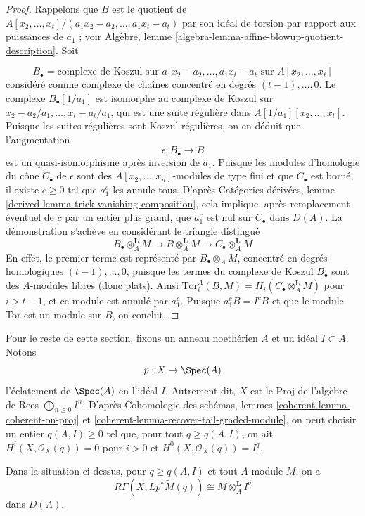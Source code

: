 \begin{proof}
Rappelons que $B$ est le quotient de $A[x_2, \ldots, x_t]/(a_1x_2 - a_2, \ldots, a_1x_t - a_t)$ par son idéal de torsion par rapport aux puissances de $a_1$ ; voir Algèbre, lemme \ref{algebra-lemma-affine-blowup-quotient-description}. Soit

$$
B_\bullet = \text{complexe de Koszul sur }a_1x_2 - a_2, \ldots, a_1x_t - a_t
\text{ sur }A[x_2, \ldots, x_t]
$$
considéré comme complexe de chaînes concentré en degrés $(t - 1), \ldots, 0$. Le complexe $B_\bullet[1/a_1]$ est isomorphe au complexe de Koszul sur $x_2 - a_2/a_1, \ldots, x_t - a_t/a_1$, qui est une suite régulière dans $A[1/a_1][x_2, \ldots, x_t]$. Puisque les suites régulières sont Koszul-régulières, on en déduit que l'augmentation
$$
\epsilon : B_\bullet \longrightarrow B
$$
est un quasi-isomorphisme après inversion de $a_1$. Puisque les modules d'homologie du cône $C_\bullet$ de $\epsilon$ sont des $A[x_2, \ldots, x_n]$-modules de type fini et que $C_\bullet$ est borné, il existe $c \geq 0$ tel que $a_1^c$ les annule tous. D'après Catégories dérivées, lemme \ref{derived-lemma-trick-vanishing-composition}, cela implique, après remplacement éventuel de $c$ par un entier plus grand, que $a_1^c$ est nul sur $C_\bullet$ dans $D(A)$. La démonstration s'achève en considérant le triangle distingué
$$
B_\bullet \otimes_A^\mathbf{L} M \to
B \otimes_A^\mathbf{L} M \to
C_\bullet \otimes_A^\mathbf{L} M
$$
En effet, le premier terme est représenté par $B_\bullet \otimes_A M$, concentré en degrés homologiques $(t - 1), \ldots, 0$, puisque les termes du complexe de Koszul $B_\bullet$ sont des $A$-modules libres (donc plats). Ainsi $\text{Tor}_i^A(B, M) = H_i(C_\bullet \otimes_A^\mathbf{L} M)$ pour $i > t - 1$, et ce module est annulé par $a_1^c$. Puisque $a_1^cB = I^cB$ et que le module Tor est un module sur $B$, on conclut.
\end{proof}

\noindent
Pour le reste de cette section, fixons un anneau noethérien $A$ et un idéal $I \subset A$. Notons
$$
p : X \to \Spec(A)
$$
l'éclatement de $\Spec(A)$ en l'idéal $I$. Autrement dit, $X$ est le $\text{Proj}$ de l'algèbre de Rees $\bigoplus_{n \geq 0} I^n$. D'après Cohomologie des schémas, lemmes \ref{coherent-lemma-coherent-on-proj} et \ref{coherent-lemma-recover-tail-graded-module}, on peut choisir un entier $q(A, I) \geq 0$ tel que, pour tout $q \geq q(A, I)$, on ait $H^i(X, \mathcal{O}_X(q)) = 0$ pour $i > 0$ et $H^0(X, \mathcal{O}_X(q)) = I^q$.

\begin{lemma}
\label{lemma-compute-tor-Iq}
Dans la situation ci-dessus, pour $q \geq q(A, I)$ et tout $A$-module $M$, on a
$$
R\Gamma(X, Lp^*\widetilde{M}(q)) \cong M \otimes_A^\mathbf{L} I^q
$$
dans $D(A)$.
\end{lemma}

